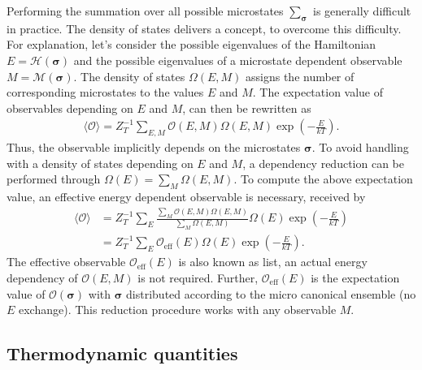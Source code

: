 Performing the summation over all possible microstates $\sum_{\bm{\sigma}}$ is generally difficult in practice. The density of states delivers a 
concept, to overcome this difficulty. For explanation, let's consider the possible eigenvalues of the Hamiltonian $E\!=\!\mathcal{H}(\bm{\sigma})$ and 
the possible eigenvalues of a microstate dependent observable $M\!=\!\mathcal{M}(\bm{\sigma})$. The density of states $\Omega(E,M)$ assigns 
the number of corresponding microstates to the values $E$ and $M$. The expectation value of observables depending on $E$ and $M$,
can then be rewritten as
\begin{align*}
    \langle \mathcal{O} \rangle = Z_T^{-1}\sum_{E,M}\mathcal{O}(E,M)\Omega(E,M)\exp\left(-\frac{E}{kT}\right).
\end{align*}
Thus, the observable implicitly depends on the microstates $\bm{\sigma}$. To avoid handling with a density of states depending on $E$ and $M$, a
dependency reduction can be performed through $\Omega(E)\!=\!\sum_{M}\Omega(E,M)$. To compute the above expectation value, an effective
energy dependent observable is necessary, received by
\begin{align}
    \langle \mathcal{O} \rangle &= Z_T^{-1}\sum_{E}\frac{\sum_M\mathcal{O}(E,M)\Omega(E,M)}{\sum_M\Omega(E,M)}\Omega(E)\exp\left(-\frac{E}{kT}\right) \nonumber \\
                                &= Z_T^{-1}\sum_{E}\mathcal{O}_\text{eff}(E)\Omega(E)\exp\left(-\frac{E}{kT}\right).
    \label{align:Lists}
\end{align}
The effective observable $\mathcal{O}_\text{eff}(E)$ is also known as list, an actual energy
dependency of $\mathcal{O}(E,M)$ is not required. Further, $\mathcal{O}_\text{eff}(E)$ is the expectation value of $\mathcal{O}(\bm{\sigma})$ with 
$\bm{\sigma}$ distributed according to the micro canonical ensemble (no $E$ exchange). This reduction procedure works with any observable $M$.~\cite{Janke2012}





\subsection*{Thermodynamic quantities}

